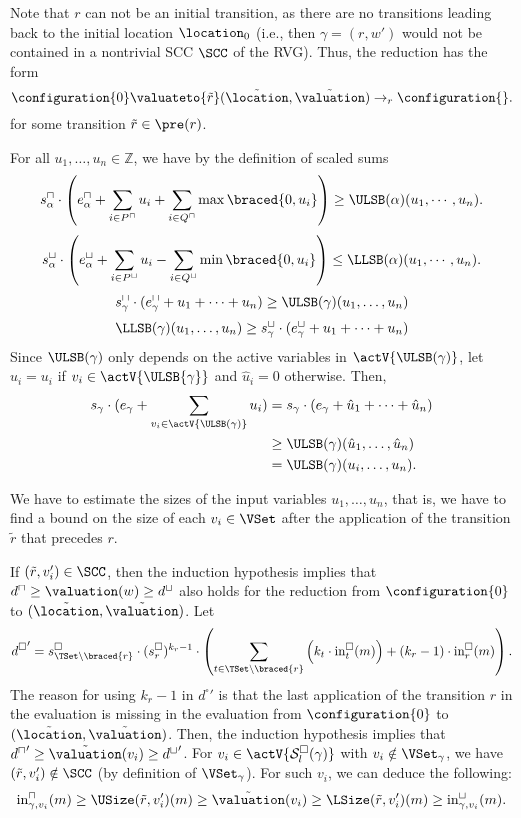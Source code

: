 Note that $r$ can not be an initial transition, as there are no transitions leading back to the initial location $\location_0$
(i.e., then $\gamma = (r, w')$ would not be contained in a nontrivial SCC $\SCC$ of the RVG).
Thus, the reduction has the form
\[ \configuration{0} \valuateto{\tilde{r}} (\tilde{\location}, \tilde{\valuation}) \rightarrow_r \configuration{}. \]
for some transition $\tilde{r} \in \pre(r)$.

For all $u_1, \dots, u_n \in \mathbb{Z}$, we have by the definition of scaled sums
  \[ s^\sqcap_\alpha \cdot \left( e^\sqcap_\alpha + \sum_{i \in P^\sqcap} u_i + \sum_{i \in Q^\sqcap} \max \braced{0,u_i} \right) \geq \ULSB(\alpha)(u_1, \cdots, u_n). \]
  \[ s^\sqcup_\alpha \cdot \left( e^\sqcup_\alpha + \sum_{i \in P^\sqcup} u_i - \sum_{i \in Q^\sqcup} \min \braced{0,u_i} \right) \leq \LLSB(\alpha)(u_1, \cdots, u_n). \]
\[ s^\sqcap_\gamma \cdot (e^\sqcap_\gamma + u_1 + \dots + u_n) \geq \ULSB(\gamma)(u_1, \dots, u_n) \]
\[ \LLSB(\gamma)(u_1, \dots, u_n) \geq s^\sqcup_\gamma \cdot (e^\sqcup_\gamma + u_1 + \dots + u_n) \]
Since $\ULSB(\gamma)$ only depends on the active variables in $\actV{\ULSB(\gamma)}$, let $\hat{u}_i = u_i$ if $v_i \in \actV{\ULSB{\gamma}}$ and $\hat{u}_i = 0$ otherwise.
Then,
\begin{align*}
  s_\gamma \cdot (e_\gamma + \sum_{v_i \in \actV{\ULSB(\gamma)}} u_i) &= s_\gamma \cdot (e_\gamma + \hat{u}_1 + \dots + \hat{u}_n) \\
  & \geq \ULSB(\gamma)(\hat{u}_1, \dots, \hat{u}_n) \\
  &= \ULSB(\gamma)(u_i, \dots, u_n).
\end{align*}

We have to estimate the sizes of the input variables $u_1, \dots, u_n$,
that is, we have to find a bound on the size of each $v_i \in \VSet$ after the application of the transition $\tilde{r}$ that precedes $r$.

If $(\tilde{r}, v'_i) \in \SCC$, then the induction hypothesis implies that $d^\sqcap \geq \valuation(w) \geq d^\sqcup$ also holds for the reduction from $\configuration{0}$ to $(\tilde{\location}, \tilde{\valuation})$.
Let
\[ {d^\square}' = s^\square_{\TSet \setminus \braced{r}} \cdot (s^\square_r)^{k_r - 1} \cdot \left( \sum_{t \in \TSet \setminus \braced{r}} \left( k_t \cdot \text{in}^\square_t(m) \right) + \left( k_r - 1 \right) \cdot \text{in}^\square_r(m) \right). \]
The reason for using $k_r - 1$ in ${d^\square}'$ is that the last application of the transition $r$ in the evaluation is missing in the evaluation from $\configuration{0}$ to $(\tilde{\location}, \tilde{\valuation})$.
Then, the induction hypothesis implies that ${d^\sqcap}' \geq \tilde{\valuation}(v_i) \geq {d^\sqcup}'$.
For $v_i \in \actV{\mathcal{S}^\square_l(\gamma)}$ with $v_i \notin \VSet_\gamma$, we have $(\tilde{r}, v'_i) \notin \SCC$ (by definition of $\VSet_\gamma$).
For such $v_i$, we can deduce the following:
\[ \text{in}^\sqcap_{\gamma,{v_i}}(m) \geq \USize(\tilde{r}, v'_i)(m) \geq \tilde{\valuation}(v_i) \geq \LSize(\tilde{r}, v'_i)(m) \geq \text{in}^\sqcup_{\gamma,{v_i}}(m). \]

